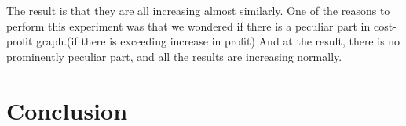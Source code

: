 The result is that they are all increasing almost similarly. One of the reasons to perform this experiment was that we wondered if there is a peculiar part in cost-profit graph.(if there is exceeding increase in profit) And at the result, there is no prominently peculiar part, and all the results are increasing normally.


\section{Conclusion}




